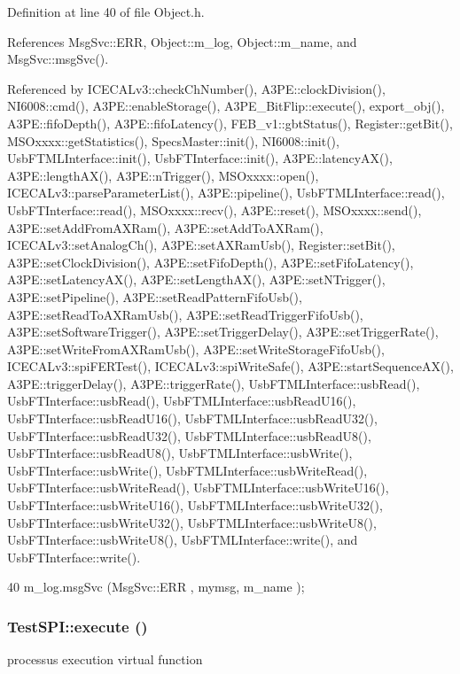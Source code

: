 Definition at line 40 of file Object.h.

References MsgSvc::ERR, Object::m\_\-log, Object::m\_\-name, and MsgSvc::msgSvc().

Referenced by ICECALv3::checkChNumber(), A3PE::clockDivision(), NI6008::cmd(), A3PE::enableStorage(), A3PE\_\-BitFlip::execute(), export\_\-obj(), A3PE::fifoDepth(), A3PE::fifoLatency(), FEB\_\-v1::gbtStatus(), Register::getBit(), MSOxxxx::getStatistics(), SpecsMaster::init(), NI6008::init(), UsbFTMLInterface::init(), UsbFTInterface::init(), A3PE::latencyAX(), A3PE::lengthAX(), A3PE::nTrigger(), MSOxxxx::open(), ICECALv3::parseParameterList(), A3PE::pipeline(), UsbFTMLInterface::read(), UsbFTInterface::read(), MSOxxxx::recv(), A3PE::reset(), MSOxxxx::send(), A3PE::setAddFromAXRam(), A3PE::setAddToAXRam(), ICECALv3::setAnalogCh(), A3PE::setAXRamUsb(), Register::setBit(), A3PE::setClockDivision(), A3PE::setFifoDepth(), A3PE::setFifoLatency(), A3PE::setLatencyAX(), A3PE::setLengthAX(), A3PE::setNTrigger(), A3PE::setPipeline(), A3PE::setReadPatternFifoUsb(), A3PE::setReadToAXRamUsb(), A3PE::setReadTriggerFifoUsb(), A3PE::setSoftwareTrigger(), A3PE::setTriggerDelay(), A3PE::setTriggerRate(), A3PE::setWriteFromAXRamUsb(), A3PE::setWriteStorageFifoUsb(), ICECALv3::spiFERTest(), ICECALv3::spiWriteSafe(), A3PE::startSequenceAX(), A3PE::triggerDelay(), A3PE::triggerRate(), UsbFTMLInterface::usbRead(), UsbFTInterface::usbRead(), UsbFTMLInterface::usbReadU16(), UsbFTInterface::usbReadU16(), UsbFTMLInterface::usbReadU32(), UsbFTInterface::usbReadU32(), UsbFTMLInterface::usbReadU8(), UsbFTInterface::usbReadU8(), UsbFTMLInterface::usbWrite(), UsbFTInterface::usbWrite(), UsbFTMLInterface::usbWriteRead(), UsbFTInterface::usbWriteRead(), UsbFTMLInterface::usbWriteU16(), UsbFTInterface::usbWriteU16(), UsbFTMLInterface::usbWriteU32(), UsbFTInterface::usbWriteU32(), UsbFTMLInterface::usbWriteU8(), UsbFTInterface::usbWriteU8(), UsbFTMLInterface::write(), and UsbFTInterface::write().


\begin{DoxyCode}
40 { m_log.msgSvc (MsgSvc::ERR     , mymsg, m_name ); }
\end{DoxyCode}
\hypertarget{classTestSPI_afe77bfff2e5454c8b3d012721d1f0a99}{
\subsubsection[{execute}]{ TestSPI::execute ()}}
\label{classTestSPI_afe77bfff2e5454c8b3d012721d1f0a99}
processus execution virtual function 


